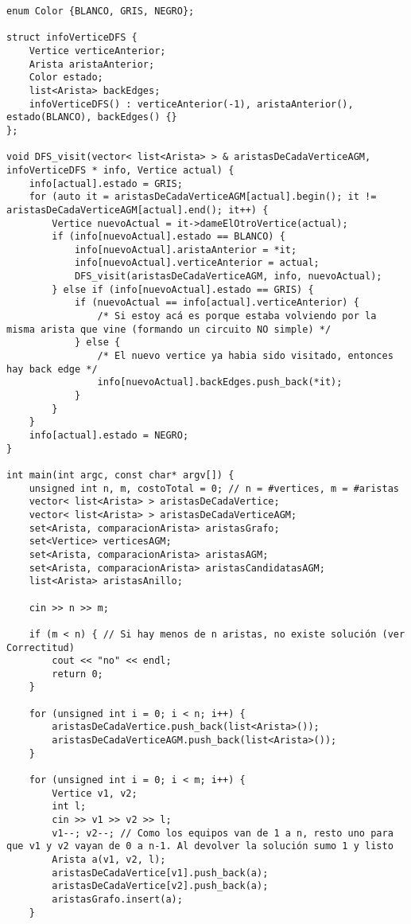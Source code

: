 \begin{lstlisting}[frame=single]
enum Color {BLANCO, GRIS, NEGRO};

struct infoVerticeDFS {
    Vertice verticeAnterior;
    Arista aristaAnterior;
    Color estado;
    list<Arista> backEdges;
    infoVerticeDFS() : verticeAnterior(-1), aristaAnterior(), estado(BLANCO), backEdges() {}
};

void DFS_visit(vector< list<Arista> > & aristasDeCadaVerticeAGM, infoVerticeDFS * info, Vertice actual) {
    info[actual].estado = GRIS;
    for (auto it = aristasDeCadaVerticeAGM[actual].begin(); it != aristasDeCadaVerticeAGM[actual].end(); it++) {
        Vertice nuevoActual = it->dameElOtroVertice(actual);
        if (info[nuevoActual].estado == BLANCO) {
            info[nuevoActual].aristaAnterior = *it;
            info[nuevoActual].verticeAnterior = actual;
            DFS_visit(aristasDeCadaVerticeAGM, info, nuevoActual);
        } else if (info[nuevoActual].estado == GRIS) {
            if (nuevoActual == info[actual].verticeAnterior) {
                /* Si estoy acá es porque estaba volviendo por la misma arista que vine (formando un circuito NO simple) */
            } else {
                /* El nuevo vertice ya habia sido visitado, entonces hay back edge */
                info[nuevoActual].backEdges.push_back(*it);
            }
        }
    }
    info[actual].estado = NEGRO;
}

int main(int argc, const char* argv[]) {
    unsigned int n, m, costoTotal = 0; // n = #vertices, m = #aristas
    vector< list<Arista> > aristasDeCadaVertice;
    vector< list<Arista> > aristasDeCadaVerticeAGM;
    set<Arista, comparacionArista> aristasGrafo;
    set<Vertice> verticesAGM;
    set<Arista, comparacionArista> aristasAGM;
    set<Arista, comparacionArista> aristasCandidatasAGM;
    list<Arista> aristasAnillo;
    
    cin >> n >> m;
    
    if (m < n) { // Si hay menos de n aristas, no existe solución (ver Correctitud)
        cout << "no" << endl;
        return 0;
    }
    
    for (unsigned int i = 0; i < n; i++) {
        aristasDeCadaVertice.push_back(list<Arista>());
        aristasDeCadaVerticeAGM.push_back(list<Arista>());
    }
    
    for (unsigned int i = 0; i < m; i++) {
        Vertice v1, v2;
        int l;
        cin >> v1 >> v2 >> l;
        v1--; v2--; // Como los equipos van de 1 a n, resto uno para que v1 y v2 vayan de 0 a n-1. Al devolver la solución sumo 1 y listo
        Arista a(v1, v2, l);
        aristasDeCadaVertice[v1].push_back(a);
        aristasDeCadaVertice[v2].push_back(a);
        aristasGrafo.insert(a);
    }
    

\end{lstlisting}
